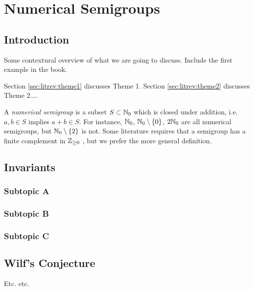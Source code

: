 \chapter{Numerical Semigroups}\label{chap:probmet}

\section{Introduction}\label{sec:probmet:intro}

Some contextural overview of what we are going to discuss. Include the first example in the book. 

Section \ref{sec:litrev:theme1} discusses Theme 1. Section \ref{sec:litrev:theme2} discusses Theme 2....

A \textit{numerical semigroup} is a subset $S \subset \mathbb{N}_{0}$ which is closed under addition, i.e. $a, b \in S$ implies $a + b \in S$. For instance, $\mathbb{N}_0$, $\mathbb{N}_0 \setminus \{0\}$, $2\mathbb{N}_0$ are all numerical semigroups, but $\mathbb{N}_0 \setminus \{2\}$ is not. Some literature requires that a semigroup has a finite complement in $\mathbb{Z}_{\geq 0}$ \cite{chapman2020beyond}, but we prefer the more general definition. 


\section{Invariants}\label{sec:probmet:theme1}


\subsection{Subtopic A}\label{sec:probmet:theme1:A}

\subsection{Subtopic B}\label{sec:probmet:theme1:B}

\subsection{Subtopic C}\label{sec:probmet:theme1:C}

\section{Wilf's Conjecture}\label{sec:probmet:theme2}

Etc. etc.
